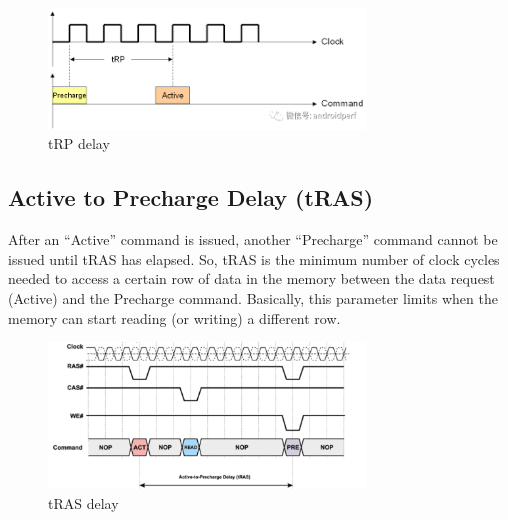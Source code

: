 \documentclass[12pt]{article}
\begin{document}
\begin{figure}[H]
	\centering
		\includegraphics[width=0.75\textwidth]{./images/tRP.png}
	\caption{tRP delay \cite{cloudtencent}}
	\label{fig:tRP}
\end{figure}

\subsection{Active to Precharge Delay (tRAS)}
After an “Active” command is issued, another “Precharge” command cannot be issued until tRAS has elapsed. So, tRAS is the minimum number of clock cycles needed to access a certain row of data in the memory between the data request (Active) and the Precharge command. Basically, this parameter limits when the memory can start reading (or writing) a different row.

\begin{figure}[H]
	\centering
		\includegraphics[width=0.75\textwidth]{./images/tRAS.png}
	\caption{tRAS delay \cite{tRASWeb}}
	\label{fig:tRAS}
\end{figure}



\end{document}
